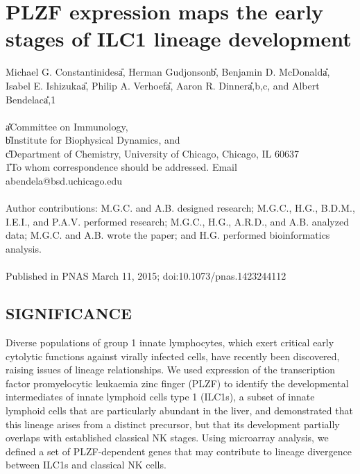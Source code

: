 


\chapter[PLZF expression maps the early stages of ILC1 lineage \\ development]{PLZF expression maps the early stages of ILC1 lineage development}

Michael G. Constantinides\U{a}, Herman Gudjonson\U{b}, Benjamin D. McDonald\U{a}, Isabel E. Ishizuka\U{a}, Philip A. Verhoef\U{a}, Aaron R. Dinner\U{a,b,c}, and Albert Bendelac\U{a,1}
\\ \\
\U{a}Committee on Immunology,\\
\U{b}Institute for Biophysical Dynamics, and \\
\U{c}Department of Chemistry, University of Chicago, Chicago, IL 60637 
\\
\U{1}To whom correspondence should be addressed. Email\: abendela@bsd.uchicago.edu
\\ \\
Author contributions: M.G.C. and A.B. designed research; M.G.C., H.G., B.D.M., I.E.I., and P.A.V. performed research; M.G.C., H.G., A.R.D., and A.B. analyzed data; M.G.C. and A.B. wrote the paper; and H.G. performed bioinformatics analysis.
\\ \\
Published in PNAS March 11, 2015; doi:10.1073/pnas.1423244112

\newpage
\section{SIGNIFICANCE}
Diverse populations of group 1 innate lymphocytes, which exert critical early cytolytic functions against virally infected cells, have recently been discovered, raising issues of lineage relationships. We used expression of the transcription factor promyelocytic leukaemia zinc finger (PLZF) to identify the developmental intermediates of innate lymphoid cells type 1 (ILC1s), a subset of innate lymphoid cells that are particularly abundant in the liver, and demonstrated that this lineage arises from a distinct precursor, but that its development partially overlaps with established classical NK stages. Using microarray analysis, we defined a set of PLZF-dependent genes that may contribute to lineage divergence between ILC1s and classical NK cells.

